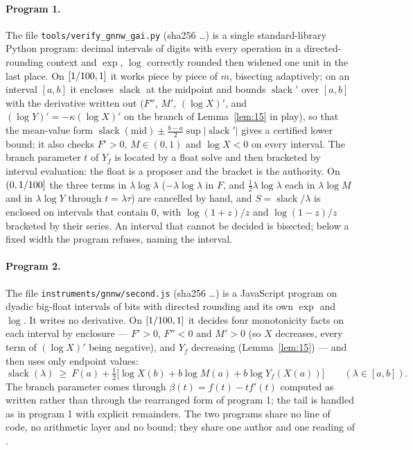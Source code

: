 \documentclass[11pt]{article}
\newcommand{\slack}{\operatorname{slack}}
\begin{document}
\paragraph{Program 1.} The file \texttt{tools/\allowbreak verify\_gnnw\_gai.py} (sha256 \VerifierSha\ldots) is a single standard-library Python program: decimal intervals of \PrecisionPy{} digits with every operation in a directed-rounding context and $\exp$, $\log$ correctly rounded then widened one unit in the last place. On $[1/100,1]$ it works piece by piece of $m$, bisecting adaptively; on an interval $[a,b]$ it encloses $\slack$ at the midpoint and bounds $\slack'$ over $[a,b]$ with the derivative written out ($F''$, $M'$, $(\log X)'$, and $(\log Y)'=-\kappa(\log X)'$ on the branch of Lemma~\ref{lem:15} in play), so that the mean-value form $\slack(\text{mid})\pm\tfrac{b-a}2\sup|\slack'|$ gives a certified lower bound; it also checks $F'>0$, $M\in(0,1)$ and $\log X<0$ on every interval. The branch parameter $t$ of $Y_f$ is located by a float solve and then bracketed by interval evaluation: the float is a proposer and the bracket is the authority. On $(0,1/100]$ the three terms in $\lambda\log\lambda$ ($-\lambda\log\lambda$ in $F$, and $\tfrac12\lambda\log\lambda$ each in $\lambda\log M$ and in $\lambda\log Y$ through $t=\lambda\tau$) are cancelled by hand, and $S=\slack/\lambda$ is enclosed on intervals that contain $0$, with $\log(1+z)/z$ and $\log(1-z)/z$ bracketed by their series. An interval that cannot be decided is bisected; below a fixed width the program refuses, naming the interval.

\paragraph{Program 2.} The file \texttt{instruments/\allowbreak gnnw/\allowbreak second.js} (sha256 \SecondSha\ldots) is a JavaScript program on dyadic big-float intervals of \PrecisionJs{} bits with directed rounding and its own $\exp$ and $\log$. It writes no derivative. On $[1/100,1]$ it decides four monotonicity facts on each interval by enclosure --- $F'>0$, $F''<0$ and $M'>0$ (so $X$ decreases, every term of $(\log X)'$ being negative), and $Y_f$ decreasing (Lemma~\ref{lem:15}) --- and then uses only endpoint values:
\[
\slack(\lambda)\ \ge\ F(a)+\tfrac12\bigl[\log X(b)+b\log M(a)+b\log Y_f(X(a))\bigr]\qquad(\lambda\in[a,b]).
\]
The branch parameter comes through $\beta(t)=f(t)-tf'(t)$ computed as written rather than through the rearranged form of program 1; the tail is handled as in program 1 with explicit remainders. The two programs share no line of code, no arithmetic layer and no bound; they share one author and one reading of \cite{GNNW}.
\end{document}
